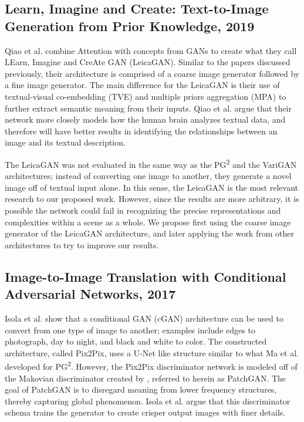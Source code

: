 \documentclass{article}
\begin{document}
\subsection*{Learn, Imagine and Create: Text-to-Image Generation from Prior Knowledge, 2019}
\nocite{leica}
Qiao et al. combine Attention with concepts from GANs to create what they call
LEarn, Imagine and CreAte GAN (LeicaGAN). Similar to the papers discussed
previously, their architecture is comprised of a coarse image generator followed
by a fine image generator. The main difference for the LeicaGAN is their use
of textual-visual co-embedding (TVE) and multiple priors aggregation (MPA)
to further extract semantic meaning from their inputs. Qiao et al. argue that
their network more closely models how the human brain analyzes textual data,
and therefore will have better results in identifying the relationships between
an image and its textual description.

The LeicaGAN was not evaluated in the same way as the PG\textsuperscript{2} and
the VariGAN architectures; instead of converting one image to another, they
generate a novel image off of textual input alone. In this sense, the LeicaGAN
is the most relevant research to our proposed work. However, since the results
are more arbitrary, it is possible the network could fail in recognizing the
precise representations and complexities within a scene as a whole.
We propose first using the coarse image generator of the LeicaGAN architecture,
and later applying the work from other architectures to try to improve
our results.

\subsection*{Image-to-Image Translation with Conditional Adversarial Networks, 2017}
\nocite{image_to_image}
Isola et al. show that a conditional GAN (cGAN) architecture can be used to
convert from one type of image to another; examples include edges to photograph,
day to night, and black and white to color. The constructed architecture, called
Pix2Pix, uses a U-Net like structure similar to what Ma et al. developed for
PG\textsuperscript{2}. However, the Pix2Pix discriminator network is modeled off
of the Makovian discriminator created by \cite{markovian},
referred to herein as PatchGAN.
The goal of PatchGAN is to disregard meaning from lower frequency structures,
thereby capturing global phenomenon. Isola et al. argue that this discriminator
schema trains the generator to create crisper output images with finer details.
\end{document}
